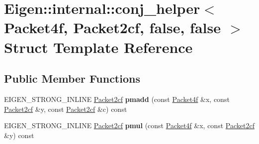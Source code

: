 \hypertarget{struct_eigen_1_1internal_1_1conj__helper_3_01_packet4f_00_01_packet2cf_00_01false_00_01false_01_4}{}\section{Eigen\+:\+:internal\+:\+:conj\+\_\+helper$<$ Packet4f, Packet2cf, false, false $>$ Struct Template Reference}
\label{struct_eigen_1_1internal_1_1conj__helper_3_01_packet4f_00_01_packet2cf_00_01false_00_01false_01_4}
\subsection*{Public Member Functions}
\begin{DoxyCompactItemize}
\item 
\mbox{\label{struct_eigen_1_1internal_1_1conj__helper_3_01_packet4f_00_01_packet2cf_00_01false_00_01false_01_4_a84c2abfd25999f66536252046bbb1240}} 
E\+I\+G\+E\+N\+\_\+\+S\+T\+R\+O\+N\+G\+\_\+\+I\+N\+L\+I\+NE \hyperlink{struct_eigen_1_1internal_1_1_packet2cf}{Packet2cf} {\bfseries pmadd} (const \hyperlink{struct_eigen_1_1internal_1_1_packet4f}{Packet4f} \&x, const \hyperlink{struct_eigen_1_1internal_1_1_packet2cf}{Packet2cf} \&y, const \hyperlink{struct_eigen_1_1internal_1_1_packet2cf}{Packet2cf} \&c) const
\item 
\mbox{\label{struct_eigen_1_1internal_1_1conj__helper_3_01_packet4f_00_01_packet2cf_00_01false_00_01false_01_4_ac60f7f53396acc85580e6d10091ae895}} 
E\+I\+G\+E\+N\+\_\+\+S\+T\+R\+O\+N\+G\+\_\+\+I\+N\+L\+I\+NE \hyperlink{struct_eigen_1_1internal_1_1_packet2cf}{Packet2cf} {\bfseries pmul} (const \hyperlink{struct_eigen_1_1internal_1_1_packet4f}{Packet4f} \&x, const \hyperlink{struct_eigen_1_1internal_1_1_packet2cf}{Packet2cf} \&y) const
\item 
\mbox{\label{struct_eigen_1_1internal_1_1conj__helper_3_01_packet4f_00_01_packet2cf_00_01false_00_01false_01_4_a84c2abfd25999f66536252046bbb1240}} 

\end{DoxyCompactItemize}
